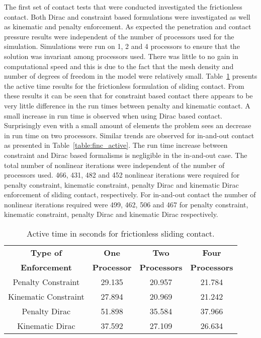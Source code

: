 \documentclass[]{article}
\begin{document}
The first set of contact tests that were conducted investigated the frictionless contact.  Both Dirac and constraint based formulations were investigated as well as kinematic and penalty enforcement.  As expected the penetration and contact pressure results were independent of the number of processors used for the simulation.  Simulations were run on 1, 2 and 4 processors to ensure that the solution was invariant among processors used.  There was little to no gain in computational speed and this is due to the fact that the mesh density and number of degrees of freedom in the model were relatively small. Table~\ref{table:fsc_active}  presents the active time results for the frictionless formulation of sliding contact.  From these results it can be seen that for constraint based contact there appears to be very little difference in the run times between penalty and kinematic contact.  A small increase in run time is observed when using Dirac based contact.  Surprisingly even with a small amount of elements the problem sees an decrease in run time on two processors.  Similar trends are observed for in-and-out contact as presented in Table~\ref{table:finc_active}.  The run time increase between constraint and Dirac based formalisms is negligible in the in-and-out case.  The total number of nonlinear iterations were independent of the number of processors used.  466, 431, 482 and 452 nonlinear iterations were required for penalty constraint, kinematic constraint, penalty Dirac and kinematic Dirac enforcement of sliding contact, respectively.  For in-and-out contact the number of nonlinear iterations required were 499, 462, 506 and 467 for penalty constraint, kinematic constraint, penalty Dirac and kinematic Dirac respectively. \\

\begin{table}[!ht]
\caption{Active time in seconds for frictionless sliding contact.}
\centering
\begin{tabular}{cccc}
\hline
\textbf{Type of} & \textbf{One} & \textbf{Two} & \textbf{Four} \\
\textbf{Enforcement}  & \textbf{Processor} & \textbf{Processors} & \textbf{Processors}\\
\hline
Penalty Constraint & 29.135 & 20.957 & 21.784 \\
Kinematic Constraint & 27.894 & 20.969 & 21.242 \\
Penalty Dirac  & 51.898 & 35.584 & 37.966 \\
Kinematic Dirac & 37.592 & 27.109 & 26.634 \\
\hline
\end{tabular}
\label{table:fsc_active}
\end{table}
\end{document}
